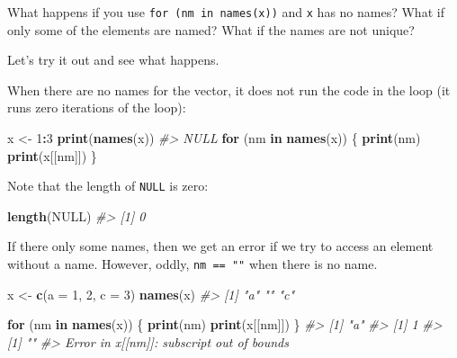 \documentclass[]{book}
\newenvironment{Shaded}{\begin{snugshade}}{\end{snugshade}}
\newcommand{\CommentTok}[1]{\textcolor[rgb]{0.56,0.35,0.01}{\textit{#1}}}
\newcommand{\ControlFlowTok}[1]{\textcolor[rgb]{0.13,0.29,0.53}{\textbf{#1}}}
\newcommand{\DataTypeTok}[1]{\textcolor[rgb]{0.13,0.29,0.53}{#1}}
\newcommand{\DecValTok}[1]{\textcolor[rgb]{0.00,0.00,0.81}{#1}}
\newcommand{\KeywordTok}[1]{\textcolor[rgb]{0.13,0.29,0.53}{\textbf{#1}}}
\newcommand{\NormalTok}[1]{#1}
\newcommand{\OperatorTok}[1]{\textcolor[rgb]{0.81,0.36,0.00}{\textbf{#1}}}
\newcommand{\OtherTok}[1]{\textcolor[rgb]{0.56,0.35,0.01}{#1}}
\newcommand{\StringTok}[1]{\textcolor[rgb]{0.31,0.60,0.02}{#1}}
\theoremstyle{plain}
\theoremstyle{remark}
\begin{document}
What happens if you use \texttt{for\ (nm\ in\ names(x))} and \texttt{x} has no names?
What if only some of the elements are named?
What if the names are not unique?

Let's try it out and see what happens.

When there are no names for the vector, it does not run the code in the loop (it runs zero iterations of the loop):

\begin{Shaded}
\begin{Highlighting}[]
\NormalTok{x <-}\StringTok{ }\DecValTok{1}\OperatorTok{:}\DecValTok{3}
\KeywordTok{print}\NormalTok{(}\KeywordTok{names}\NormalTok{(x))}
\CommentTok{#> NULL}
\ControlFlowTok{for}\NormalTok{ (nm }\ControlFlowTok{in} \KeywordTok{names}\NormalTok{(x)) \{}
  \KeywordTok{print}\NormalTok{(nm)}
  \KeywordTok{print}\NormalTok{(x[[nm]])}
\NormalTok{\}}
\end{Highlighting}
\end{Shaded}

Note that the length of \texttt{NULL} is zero:

\begin{Shaded}
\begin{Highlighting}[]
\KeywordTok{length}\NormalTok{(}\OtherTok{NULL}\NormalTok{)}
\CommentTok{#> [1] 0}
\end{Highlighting}
\end{Shaded}

If there only some names, then we get an error if we try to access an element without a name.
However, oddly, \texttt{nm\ ==\ ""} when there is no name.

\begin{Shaded}
\begin{Highlighting}[]
\NormalTok{x <-}\StringTok{ }\KeywordTok{c}\NormalTok{(}\DataTypeTok{a =} \DecValTok{1}\NormalTok{, }\DecValTok{2}\NormalTok{, }\DataTypeTok{c =} \DecValTok{3}\NormalTok{)}
\KeywordTok{names}\NormalTok{(x)}
\CommentTok{#> [1] "a" ""  "c"}
\end{Highlighting}
\end{Shaded}

\begin{Shaded}
\begin{Highlighting}[]
\ControlFlowTok{for}\NormalTok{ (nm }\ControlFlowTok{in} \KeywordTok{names}\NormalTok{(x)) \{}
  \KeywordTok{print}\NormalTok{(nm)}
  \KeywordTok{print}\NormalTok{(x[[nm]])}
\NormalTok{\}}
\CommentTok{#> [1] "a"}
\CommentTok{#> [1] 1}
\CommentTok{#> [1] ""}
\CommentTok{#> Error in x[[nm]]: subscript out of bounds}
\end{Highlighting}
\end{Shaded}
\end{document}
